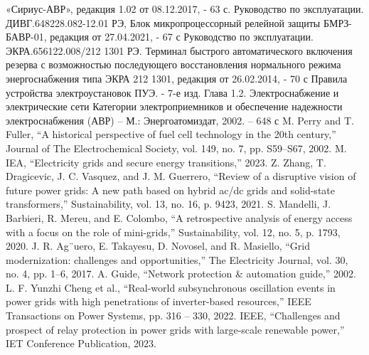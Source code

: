 «Сириус-АВР», редакция 1.02 от 08.12.2017, - 63 с.
Руководство по эксплуатации. ДИВГ.648228.082-12.01 РЭ, Блок микропроцессорный релейной
защиты БМРЗ-БАВР-01, редакция от 27.04.2021, - 67 с
Руководство по эксплуатации. ЭКРА.656122.008/212 1301 РЭ. Терминал быстрого
автоматического включения резерва с возможностью последующего восстановления нормального
режима энергоснабжения типа ЭКРА 212 1301, редакция от 26.02.2014, - 70 с
Правила устройства электроустановок ПУЭ. - 7-е изд. Глава 1.2. Электроснабжение и
электрические сети Категории электроприемников и обеспечение надежности электроснабжения
(АВР) – М.: Энергоатомиздат, 2002. – 648 с
M. Perry and T. Fuller, “A historical perspective of fuel cell technology in the 20th
century,” Journal of The Electrochemical Society, vol. 149, no. 7, pp. S59–S67, 2002.
M. IEA, “Electricity grids and secure energy transitions,” 2023.
Z. Zhang, T. Dragicevic, J. C. Vasquez, and J. M. Guerrero, “Review of a disruptive vision
of future power grids: A new path based on hybrid ac/dc grids and solid-state
transformers,” Sustainability, vol. 13, no. 16, p. 9423, 2021.
S. Mandelli, J. Barbieri, R. Mereu, and E. Colombo, “A retrospective analysis of energy
access with a focus on the role of mini-grids,” Sustainability, vol. 12, no. 5, p. 1793,
2020.
J. R. Ag¨uero, E. Takayesu, D. Novosel, and R. Masiello, “Grid modernization: challenges
and opportunities,” The Electricity Journal, vol. 30, no. 4, pp. 1–6, 2017.
A. Guide, “Network protection \& automation guide,” 2002.
L. F. Yunzhi Cheng et al., “Real-world subsynchronous oscillation events in power grids
with high penetrations of inverter-based resources,” IEEE Transactions on Power Systems,
pp. 316 – 330, 2022.
IEEE, “Challenges and prospect of relay protection in power grids with large-scale
renewable power,” IET Conference Publication, 2023.
